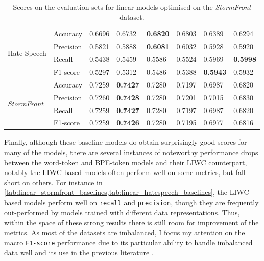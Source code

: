 \begin{table}
{\begin{tabular}{ll|ll|ll|ll}
    \multirow{4}{*}{Hate Speech}          & Accuracy  & 0.6696      & 0.6732        & \bf{0.6820} & 0.6803      & 0.6389      & 0.6294      \\
                                          & Precision & 0.5821      & 0.5888        & \bf{0.6081} & 0.6032      & 0.5928      & 0.5920      \\
                                          & Recall    & 0.5438      & 0.5459        & 0.5586      & 0.5524      & 0.5969      & \bf{0.5998} \\
                                          & F1-score  & 0.5297      & 0.5312        & 0.5486      & 0.5388      & \bf{0.5943} & 0.5932      \\\hline
    \multirow{4}{*}{\textit{StormFront}}  & Accuracy  & 0.7259      & \bf{0.7427}   & 0.7280      & 0.7197      & 0.6987      & 0.6820      \\
                                          & Precision & 0.7260      & \bf{0.7428}   & 0.7280      & 0.7201      & 0.7015      & 0.6830      \\
                                          & Recall    & 0.7259      & \bf{0.7427}   & 0.7280      & 0.7197      & 0.6987      & 0.6820      \\
                                          & F1-score  & 0.7259      & \bf{0.7426}   & 0.7280      & 0.7195      & 0.6977      & 0.6816
    \end{tabular}%
    }
    \caption{Scores on the evaluation sets for linear models optimised on the \textit{StormFront} dataset.}
    \label{tab:linear_stormfront_baselines}
\end{table}

Finally, although these baseline models do obtain surprisingly good scores for many of the models, there are several instances of noteworthy performance drops between the word-token and BPE-token models and their LIWC counterpart, notably the LIWC-based models often perform well on some metrics, but fall short on others. 
For instance in \cref{tab:linear_stormfront_baselines,tab:linear_hatespeech_baselines}, the LIWC-based models perform well on \texttt{recall} and \texttt{precision}, though they are frequently out-performed by models trained with different data representations. 
Thus, within the space of these strong results there is still room for improvement of the metrics.
As most of the datasets are imbalanced, I focus my attention on the macro \texttt{F1-score} performance due to its particular ability to handle imbalanced data well and its use in the previous literature \citep{Macro F1 papers}.

